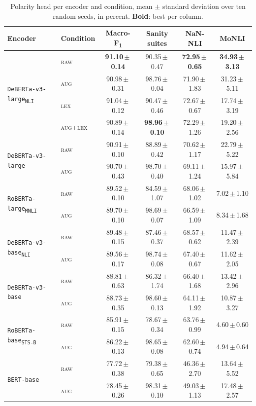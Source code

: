 \begin{table}[t]
\centering\small
\begin{tabular}{l l cccc}
\toprule
Encoder & Condition & Macro-F\textsubscript{1} & Sanity suites & NaN-NLI & MoNLI \\
\midrule
\multirow{4}{*}{\texttt{DeBERTa-v3-large\textsubscript{NLI}}} & \textsc{raw} & \textbf{91.10\,$\pm$\,0.14} & 90.35\,$\pm$\,0.47 & \textbf{72.95\,$\pm$\,0.65} & \textbf{34.93\,$\pm$\,3.13} \\
 & \textsc{aug} & 90.98\,$\pm$\,0.31 & 98.76\,$\pm$\,0.04 & 71.90\,$\pm$\,1.83 & 31.23\,$\pm$\,5.11 \\
 & \textsc{lex} & 91.04\,$\pm$\,0.12 & 90.47\,$\pm$\,0.46 & 72.67\,$\pm$\,0.67 & 17.74\,$\pm$\,3.19 \\
 & \textsc{aug+lex} & 90.89\,$\pm$\,0.14 & \textbf{98.96\,$\pm$\,0.10} & 72.29\,$\pm$\,1.26 & 19.20\,$\pm$\,2.56 \\
\multirow{2}{*}{\texttt{DeBERTa-v3-large}} & \textsc{raw} & 90.91\,$\pm$\,0.10 & 88.89\,$\pm$\,0.42 & 70.62\,$\pm$\,1.17 & 22.79\,$\pm$\,5.22 \\
 & \textsc{aug} & 90.70\,$\pm$\,0.43 & 98.70\,$\pm$\,0.40 & 69.11\,$\pm$\,1.24 & 15.97\,$\pm$\,5.84 \\
\multirow{2}{*}{\texttt{RoBERTa-large\textsubscript{MNLI}}} & \textsc{raw} & 89.52\,$\pm$\,0.10 & 84.59\,$\pm$\,1.07 & 68.06\,$\pm$\,1.02 & 7.02\,$\pm$\,1.10 \\
 & \textsc{aug} & 89.70\,$\pm$\,0.10 & 98.69\,$\pm$\,0.07 & 66.59\,$\pm$\,1.09 & 8.34\,$\pm$\,1.68 \\
\multirow{2}{*}{\texttt{DeBERTa-v3-base\textsubscript{NLI}}} & \textsc{raw} & 89.48\,$\pm$\,0.15 & 87.46\,$\pm$\,0.37 & 68.57\,$\pm$\,0.62 & 11.47\,$\pm$\,2.39 \\
 & \textsc{aug} & 89.56\,$\pm$\,0.17 & 98.74\,$\pm$\,0.08 & 67.40\,$\pm$\,0.67 & 11.62\,$\pm$\,2.05 \\
\multirow{2}{*}{\texttt{DeBERTa-v3-base}} & \textsc{raw} & 88.81\,$\pm$\,0.63 & 86.32\,$\pm$\,1.74 & 66.40\,$\pm$\,1.68 & 13.42\,$\pm$\,2.96 \\
 & \textsc{aug} & 88.73\,$\pm$\,0.35 & 98.60\,$\pm$\,0.13 & 64.11\,$\pm$\,1.92 & 10.87\,$\pm$\,3.27 \\
\multirow{2}{*}{\texttt{RoBERTa-base\textsubscript{STS-B}}} & \textsc{raw} & 85.91\,$\pm$\,0.15 & 78.67\,$\pm$\,0.34 & 63.76\,$\pm$\,0.99 & 4.60\,$\pm$\,0.60 \\
 & \textsc{aug} & 86.22\,$\pm$\,0.13 & 98.65\,$\pm$\,0.08 & 62.60\,$\pm$\,0.74 & 4.94\,$\pm$\,0.64 \\
\multirow{2}{*}{\texttt{BERT-base}} & \textsc{raw} & 77.72\,$\pm$\,0.38 & 79.38\,$\pm$\,0.65 & 46.36\,$\pm$\,2.70 & 13.64\,$\pm$\,5.52 \\
 & \textsc{aug} & 78.45\,$\pm$\,0.26 & 98.31\,$\pm$\,0.10 & 49.03\,$\pm$\,1.13 & 17.48\,$\pm$\,2.57 \\
\bottomrule
\end{tabular}
\caption{Polarity head per encoder and condition, mean $\pm$ standard deviation over ten random seeds, in percent. \textbf{Bold}: best per column.}
\label{tab:main}
\end{table}
